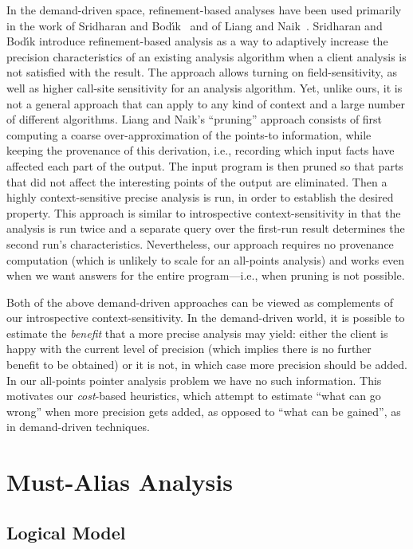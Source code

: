 In the demand-driven space, refinement-based analyses have been used primarily in the work of Sridharan and Bod\'{\i}k~\cite{pldi:2006:Sridharan} and of Liang and Naik~\cite{pldi:2011:Liang}. Sridharan and Bod\'{\i}k introduce refinement-based analysis as a way to adaptively increase the precision characteristics of an existing analysis algorithm when a client analysis is not satisfied with the result. The approach allows turning on field-sensitivity, as well as higher call-site sensitivity for an analysis algorithm. Yet, unlike ours, it is not a general approach that can apply to any kind of context and a large number of different algorithms. Liang and Naik's ``pruning'' approach consists of first computing a coarse over-approximation of the points-to information, while keeping the provenance of this derivation, i.e., recording which input facts have affected each part of the output. The input program is then pruned so that parts that did not affect the interesting points of the output are eliminated. Then a highly context-sensitive precise analysis is run, in order to establish the desired property. This approach is similar to introspective context-sensitivity in that the analysis is run twice and a separate query over the first-run result determines the second run's characteristics. Nevertheless, our approach requires no provenance computation (which is unlikely to scale for an all-points analysis) and works even when we want answers for the entire program---i.e., when pruning is not possible.

Both of the above demand-driven approaches can be viewed as complements of our introspective context-sensitivity. In the demand-driven world, it is possible to estimate the \emph{benefit} that a more precise analysis may yield: either the client is happy with the current level of precision (which implies there is no further benefit to be obtained) or it is not, in which case more precision should be added. In our all-points pointer analysis problem we have no such information. This motivates our \emph{cost}-based heuristics, which attempt to estimate ``what can go wrong'' when more precision gets added, as opposed to ``what can be gained'', as in demand-driven techniques.



\section{Must-Alias Analysis}

\subsection*{Logical Model}

